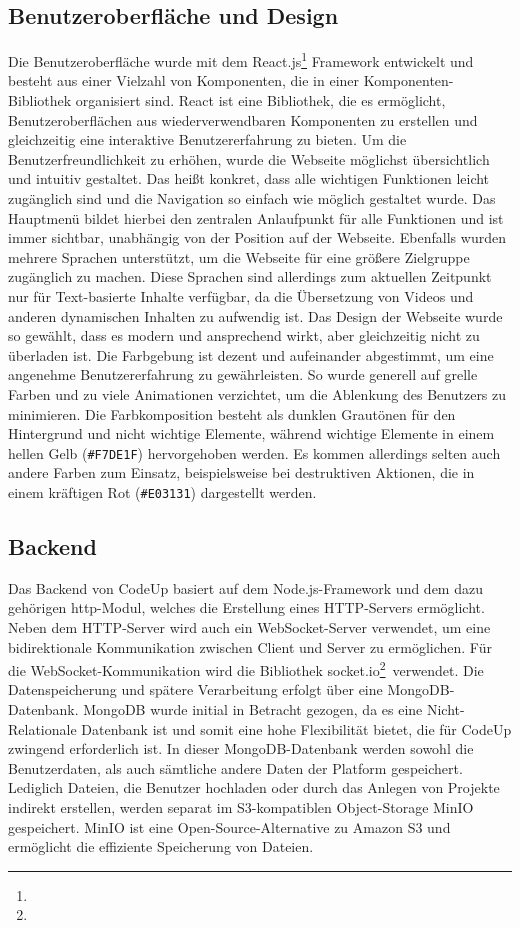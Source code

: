 \documentclass[main.tex]{subfiles}
\begin{document}
    \subsection{Benutzeroberfläche und Design}
    Die Benutzeroberfläche wurde mit dem React.js\footnote{} Framework entwickelt und besteht aus einer Vielzahl von Komponenten, die in einer Komponenten-Bibliothek organisiert sind.
    React ist eine Bibliothek, die es ermöglicht, Benutzeroberflächen aus wiederverwendbaren Komponenten zu erstellen und gleichzeitig eine interaktive Benutzererfahrung zu bieten.
    Um die Benutzerfreundlichkeit zu erhöhen, wurde die Webseite möglichst übersichtlich und intuitiv gestaltet.
    Das heißt konkret, dass alle wichtigen Funktionen leicht zugänglich sind und die Navigation so einfach wie möglich gestaltet wurde.
    Das Hauptmenü bildet hierbei den zentralen Anlaufpunkt für alle Funktionen und ist immer sichtbar, unabhängig von der Position auf der Webseite.
    Ebenfalls wurden mehrere Sprachen unterstützt, um die Webseite für eine größere Zielgruppe zugänglich zu machen.
    Diese Sprachen sind allerdings zum aktuellen Zeitpunkt nur für Text-basierte Inhalte verfügbar, da die Übersetzung von Videos und anderen dynamischen Inhalten zu aufwendig ist.
    Das Design der Webseite wurde so gewählt, dass es modern und ansprechend wirkt, aber gleichzeitig nicht zu überladen ist.
    Die Farbgebung ist dezent und aufeinander abgestimmt, um eine angenehme Benutzererfahrung zu gewährleisten.
    So wurde generell auf grelle Farben und zu viele Animationen verzichtet, um die Ablenkung des Benutzers zu minimieren.
    Die Farbkomposition besteht als dunklen Grautönen für den Hintergrund und nicht wichtige Elemente, während wichtige Elemente in einem hellen Gelb ({\color{cyellow}\texttt{\#F7DE1F}}) hervorgehoben werden.
    Es kommen allerdings selten auch andere Farben zum Einsatz, beispielsweise bei destruktiven Aktionen, die in einem kräftigen Rot ({\color{cred}\texttt{\#E03131}}) dargestellt werden.

    \subsection{Backend}
    Das Backend von CodeUp basiert auf dem Node.js-Framework und dem dazu gehörigen \dq http\dq-Modul, welches die Erstellung eines HTTP-Servers ermöglicht.
    Neben dem HTTP-Server wird auch ein WebSocket-Server verwendet, um eine bidirektionale Kommunikation zwischen Client und Server zu ermöglichen.
    Für die WebSocket-Kommunikation wird die Bibliothek \dq socket.io\dq \footnote{}\ verwendet.
    Die Datenspeicherung und spätere Verarbeitung erfolgt über eine MongoDB-Datenbank.
    MongoDB wurde initial in Betracht gezogen, da es eine Nicht-Relationale Datenbank ist und somit eine hohe Flexibilität bietet, die für CodeUp zwingend erforderlich ist.
    In dieser MongoDB-Datenbank werden sowohl die Benutzerdaten, als auch sämtliche andere Daten der Platform gespeichert.
    Lediglich Dateien, die Benutzer hochladen oder durch das Anlegen von Projekte indirekt erstellen, werden separat im S3-kompatiblen Object-Storage MinIO gespeichert.
    MinIO ist eine Open-Source-Alternative zu Amazon S3 und ermöglicht die effiziente Speicherung von Dateien.
\end{document}
